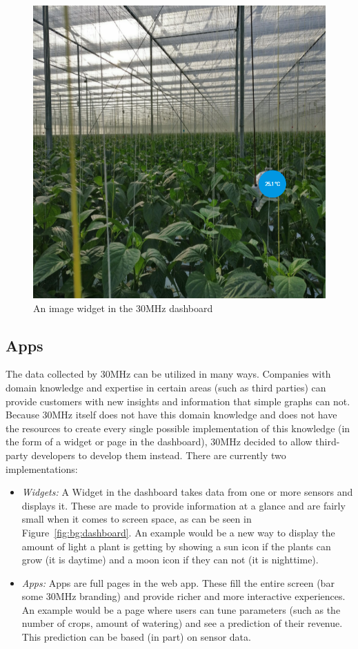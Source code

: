 \begin{figure}[htbp]
  \centering{}
  \includegraphics[width=0.6\columnwidth]{figures/background/dashboard-img.png}
  \caption{An image widget in the 30MHz dashboard}
  \label{fig:bg:dashboard-img}
  \centering
\end{figure}

\subsection{Apps}\label{sec:bg:apps}
The data collected by 30MHz can be utilized in many ways. Companies with domain knowledge and expertise in certain areas (such as third parties) can provide customers with new insights and information that simple graphs can not. Because 30MHz itself does not have this domain knowledge and does not have the resources to create every single possible implementation of this knowledge (in the form of a widget or page in the dashboard), 30MHz decided to allow third-party developers to develop them instead. There are currently two implementations:

\begin{itemize}
  \item \emph{Widgets:} A Widget in the dashboard takes data from one or more sensors and displays it. These are made to provide information at a glance and are fairly small when it comes to screen space, as can be seen in Figure~\ref{fig:bg:dashboard}. An example would be a new way to display the amount of light a plant is getting by showing a sun icon if the plants can grow (it is daytime) and a moon icon if they can not (it is nighttime).
  \item \emph{Apps:} Apps are full pages in the web app. These fill the entire screen (bar some 30MHz branding) and provide richer and more interactive experiences. An example would be a page where users can tune parameters (such as the number of crops, amount of watering) and see a prediction of their revenue. This prediction can be based (in part) on sensor data.
\end{itemize}

